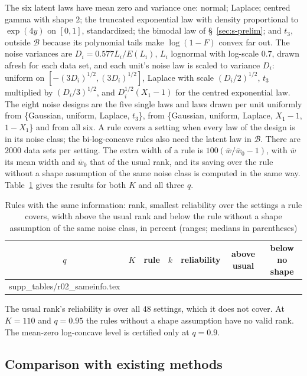 \documentclass[12pt]{article}
\makeatletter
\newcommand{\tabinput}[1]{\@@input #1 }
\renewcommand{\_}{\usc\allowbreak}
\theoremstyle{definition}
\numberwithin{equation}{section}
\newcommand{\B}{\mathcal{B}}
\makeatother
\begin{document}
The six latent laws have mean zero and variance one: normal; Laplace; centred gamma with shape $2$; the truncated exponential law with density proportional to $\exp(4y)$ on $[0, 1]$, standardized; the bimodal law of \S~\ref{sec:s-prelim}; and $t_3$, outside $\B$ because its polynomial tails make $\log(1 - F)$ convex far out. The noise variances are $D_i = 0.577L_i/E(L_i)$, $L_i$ lognormal with log-scale $0.7$, drawn afresh for each data set, and each unit's noise law is scaled to variance $D_i$: uniform on $[-(3D_i)^{1/2}, (3D_i)^{1/2}]$, Laplace with scale $(D_i/2)^{1/2}$, $t_3$ multiplied by $(D_i/3)^{1/2}$, and $D_i^{1/2}(X_1 - 1)$ for the centred exponential law. The eight noise designs are the five single laws and laws drawn per unit uniformly from \{Gaussian, uniform, Laplace, $t_3$\}, from \{Gaussian, uniform, Laplace, $X_1 - 1$, $1 - X_1$\} and from all six. A rule covers a setting when every law of the design is in its noise class; the bi-log-concave rules also need the latent law in $\B$. There are $2000$ data sets per setting. The extra width of a rule is $100(\bar w/\bar w_0 - 1)$, with $\bar w$ its mean width and $\bar w_0$ that of the usual rank, and its saving over the rule without a shape assumption of the same noise class is computed in the same way. Table~\ref{tab:s-sameinfo} gives the results for both $K$ and all three $q$.

\begin{table}[htbp]
\renewcommand{\baselinestretch}{1}
\caption{Rules with the same information: rank, smallest reliability over the settings a rule covers, width above the usual rank and below the rule without a shape assumption of the same noise class, in percent (ranges; medians in parentheses)}
\label{tab:s-sameinfo}
\centering
\fontsize{9}{11pt}\selectfont
\begin{tabular}{cclcccc}
\toprule
$q$ & $K$ & rule & $k$ & reliability & above usual & below no shape \\
\midrule
\tabinput{supp_tables/r02_sameinfo.tex}
\bottomrule
\end{tabular}
\par\smallskip
\parbox{0.95\textwidth}{\fontsize{8}{10pt}\selectfont The usual rank's reliability is over all $48$ settings, which it does not cover. At $K = 110$ and $q = 0.95$ the rules without a shape assumption have no valid rank. The mean-zero log-concave level is certified only at $q = 0.9$.}
\end{table}

\subsection{Comparison with existing methods}\label{sec:s-competitors}
\end{document}

